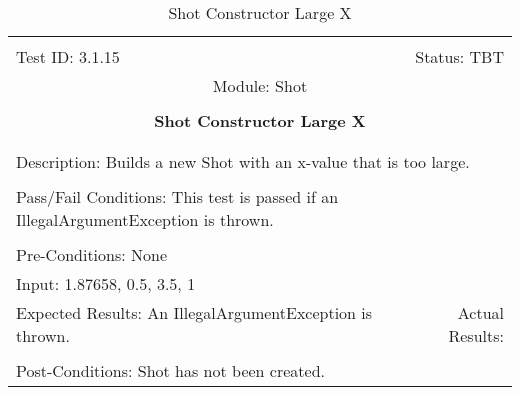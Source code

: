 \documentclass[titlepage]{article}
\begin{document}
\begin{center}%
\begin{table}[h!]
\begin{tabular}{|l r|}\hline&\\[-2mm]
	Test ID: 3.1.15	&Status: TBT\\[-3mm]
	\multicolumn{2}{|c|}{Module: Shot}\\&\\
	\multicolumn{2}{|c|}{\textbf{\large{Shot Constructor Large X}}}\\&\\\hline&\\[-3mm]
	\multicolumn{2}{|p{\textwidth}|}{Description: Builds a new Shot with an x-value that is too large.}\\[1mm]\hline&\\[-3mm]
	\multicolumn{2}{|p{\textwidth}|}{Pass/Fail Conditions: This test is passed if an IllegalArgumentException is thrown.}\\[1mm]\hline&\\[-3mm]
	\multicolumn{2}{|p{\textwidth}|}{Pre-Conditions: None}\\[4mm]
	\multicolumn{2}{|p{\textwidth}|}{Input: 1.87658, 0.5, 3.5, 1}\\[2mm]\hline
	\multicolumn{1}{|p{0.49\textwidth}}{Expected Results: An IllegalArgumentException is thrown.}	&\multicolumn{1}{|p{0.45\textwidth}|}{Actual Results: }\\\hline&\\[-3mm]
	\multicolumn{2}{|p{\textwidth}|}{Post-Conditions: Shot has not been created.}\\\hline
\end{tabular}
\caption{Shot Constructor Large X}
\end{table}
\end{center}
\newpage
\end{document}
